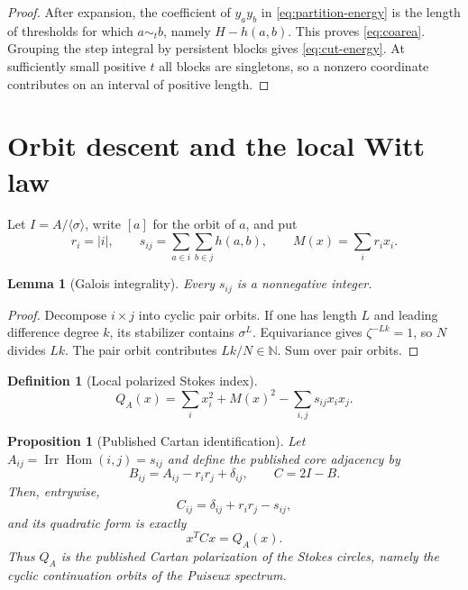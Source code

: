\documentclass[11pt,a4paper]{amsart}
\theoremstyle{plain}
\newtheorem{proposition}[theorem]{Proposition}
\newtheorem{lemma}[theorem]{Lemma}
\theoremstyle{definition}
\newtheorem{definition}[theorem]{Definition}
\newcommand{\NN}{\mathbb N}
\newcommand{\Irr}{\operatorname{Irr}}
\newcommand{\Hom}{\operatorname{Hom}}
\begin{document}
\begin{proof}
After expansion, the coefficient of $y_ay_b$ in \eqref{eq:partition-energy} is the length of
thresholds for which $a\sim_t b$, namely $H-h(a,b)$.  This proves \eqref{eq:coarea}.  Grouping the
step integral by persistent blocks gives \eqref{eq:cut-energy}.  At sufficiently small positive
$t$ all blocks are singletons, so a nonzero coordinate contributes on an interval of positive
length.
\end{proof}

\section{Orbit descent and the local Witt law}\label{sec:orbit}

Let $I=A/\langle\sigma\rangle$, write $[a]$ for the orbit of $a$, and put
\begin{equation}\label{eq:orbit-data}
 r_i=|i|,\qquad
 s_{ij}=\sum_{a\in i}\sum_{b\in j}h(a,b),\qquad
 M(x)=\sum_ir_ix_i.
\end{equation}

\begin{lemma}[Galois integrality]\label{lem:integrality}
Every $s_{ij}$ is a nonnegative integer.
\end{lemma}

\begin{proof}
Decompose $i\times j$ into cyclic pair orbits.  If one has length $L$ and leading difference
degree $k$, its stabilizer contains $\sigma^L$.  Equivariance gives $\zeta^{-Lk}=1$, so $N$ divides
$Lk$.  The pair orbit contributes $Lk/N\in\NN$.  Sum over pair orbits.
\end{proof}

\begin{definition}[Local polarized Stokes index]\label{def:local-index}
\begin{equation}\label{eq:local-index}
             Q_A(x)=\sum_i x_i^2+M(x)^2-\sum_{i,j}s_{ij}x_ix_j.
\end{equation}
\end{definition}

\begin{proposition}[Published Cartan identification]\label{prop:published-Cartan}
Let $A_{ij}=\Irr\Hom(i,j)=s_{ij}$ and define the published core adjacency by
\begin{equation}\label{eq:core-adjacency}
                 B_{ij}=A_{ij}-r_ir_j+\delta_{ij},\qquad C=2I-B.
\end{equation}
Then, entrywise,
\begin{equation}\label{eq:core-Cartan-entry}
                    C_{ij}=\delta_{ij}+r_ir_j-s_{ij},
\end{equation}
and its quadratic form is exactly
\begin{equation}\label{eq:published-Cartan-identification}
                              x^TCx=Q_A(x).
\end{equation}
Thus $Q_A$ is the published Cartan polarization of the Stokes circles, namely the cyclic
continuation orbits of the Puiseux spectrum.
\end{proposition}
\end{document}
